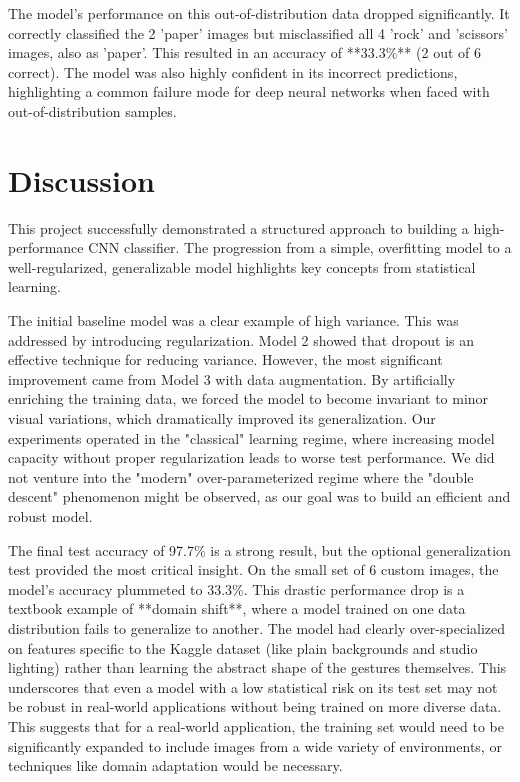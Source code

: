 \documentclass[pdflatex,sn-mathphys-num]{sn-jnl}%
\theoremstyle{thmstyleone}%
\theoremstyle{thmstyletwo}%
\theoremstyle{thmstylethree}%
\begin{document}
The model's performance on this out-of-distribution data dropped significantly. It correctly classified the 2 'paper' images but misclassified all 4 'rock' and 'scissors' images, also as 'paper'. This resulted in an accuracy of **33.3\%** (2 out of 6 correct). The model was also highly confident in its incorrect predictions, highlighting a common failure mode for deep neural networks when faced with out-of-distribution samples.

\section{Discussion}\label{sec12}

This project successfully demonstrated a structured approach to building a high-performance CNN classifier. The progression from a simple, overfitting model to a well-regularized, generalizable model highlights key concepts from statistical learning.

The initial baseline model was a clear example of high variance. This was addressed by introducing regularization. Model 2 showed that dropout is an effective technique for reducing variance. However, the most significant improvement came from Model 3 with data augmentation. By artificially enriching the training data, we forced the model to become invariant to minor visual variations, which dramatically improved its generalization. Our experiments operated in the "classical" learning regime, where increasing model capacity without proper regularization leads to worse test performance. We did not venture into the "modern" over-parameterized regime where the "double descent" phenomenon might be observed, as our goal was to build an efficient and robust model.

The final test accuracy of 97.7\% is a strong result, but the optional generalization test provided the most critical insight. On the small set of 6 custom images, the model's accuracy plummeted to 33.3\%. This drastic performance drop is a textbook example of **domain shift**, where a model trained on one data distribution fails to generalize to another. The model had clearly over-specialized on features specific to the Kaggle dataset (like plain backgrounds and studio lighting) rather than learning the abstract shape of the gestures themselves. This underscores that even a model with a low statistical risk on its test set may not be robust in real-world applications without being trained on more diverse data. This suggests that for a real-world application, the training set would need to be significantly expanded to include images from a wide variety of environments, or techniques like domain adaptation would be necessary.
\end{document}
